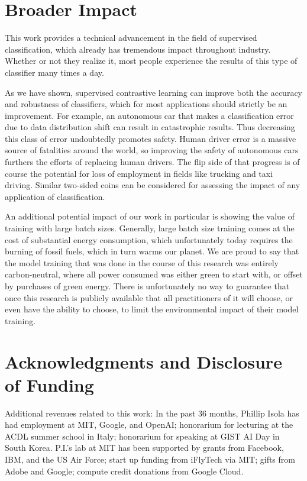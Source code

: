 \section*{Broader Impact}

This work provides a technical advancement in the field of supervised classification, which already has tremendous impact throughout industry. Whether or not they realize it, most people experience the results of this type of classifier many times a day.

As we have shown, supervised contrastive learning can improve both the accuracy and robustness of classifiers, which for most applications should strictly be an improvement. For example, an autonomous car that makes a classification error due to data distribution shift can result in catastrophic results. Thus decreasing this class of error undoubtedly promotes safety. Human driver error is a massive source of fatalities around the world, so improving the safety of autonomous cars furthers the efforts of replacing human drivers. The flip side of that progress is of course the potential for loss of employment in fields like trucking and taxi driving. Similar two-sided coins can be considered for assessing the impact of any application of classification.

An additional potential impact of our work in particular is showing the value of training with large batch sizes. Generally, large batch size training comes at the cost of substantial energy consumption, which unfortunately today requires the burning of fossil fuels, which in turn warms our planet. We are proud to say that the model training that was done in the course of this research was entirely carbon-neutral, where all power consumed was either green to start with, or offset by purchases of green energy. There is unfortunately no way to guarantee that once this research is publicly available that all practitioners of it will choose, or even have the ability to choose, to limit the environmental impact of their model training.

\section*{Acknowledgments and Disclosure of Funding}

Additional revenues related to this work: In the past 36 months, Phillip Isola has had employment at MIT, Google, and OpenAI; honorarium for lecturing at the ACDL summer school in Italy; honorarium for speaking at GIST AI Day in South Korea. P.I.'s lab at MIT has been supported by grants from Facebook, IBM, and the US Air Force; start up funding from iFlyTech via MIT; gifts from Adobe and Google; compute credit donations from Google Cloud.

